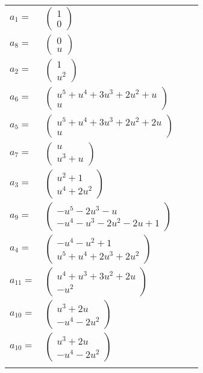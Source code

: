 \documentclass[1p]{elsarticle_modified}
\theoremstyle{definition}
\begin{document}
\begin{tabular}{m{7pt} m{180pt} m{7pt} m{180pt} }
\flushright $a_{1}=$&$\begin{pmatrix}1\\0\end{pmatrix}$ \\
\flushright $a_{8}=$&$\begin{pmatrix}0\\u\end{pmatrix}$ \\
\flushright $a_{2}=$&$\begin{pmatrix}1\\u^2\end{pmatrix}$ \\
\flushright $a_{6}=$&$\begin{pmatrix}u^5+u^4+3 u^3+2 u^2+u\\u\end{pmatrix}$ \\
\flushright $a_{5}=$&$\begin{pmatrix}u^5+u^4+3 u^3+2 u^2+2 u\\u\end{pmatrix}$ \\
\flushright $a_{7}=$&$\begin{pmatrix}u\\u^3+u\end{pmatrix}$ \\
\flushright $a_{3}=$&$\begin{pmatrix}u^2+1\\u^4+2 u^2\end{pmatrix}$ \\
\flushright $a_{9}=$&$\begin{pmatrix}- u^5-2 u^3- u\\- u^4- u^3-2 u^2-2 u+1\end{pmatrix}$ \\
\flushright $a_{4}=$&$\begin{pmatrix}- u^4- u^2+1\\u^5+u^4+2 u^3+2 u^2\end{pmatrix}$ \\
\flushright $a_{11}=$&$\begin{pmatrix}u^4+u^3+3 u^2+2 u\\- u^2\end{pmatrix}$ \\
\flushright $a_{10}=$&$\begin{pmatrix}u^3+2 u\\- u^4-2 u^2\end{pmatrix}$\\ \flushright $a_{10}=$&$\begin{pmatrix}u^3+2 u\\- u^4-2 u^2\end{pmatrix}$\\&\end{tabular}
\end{document}
